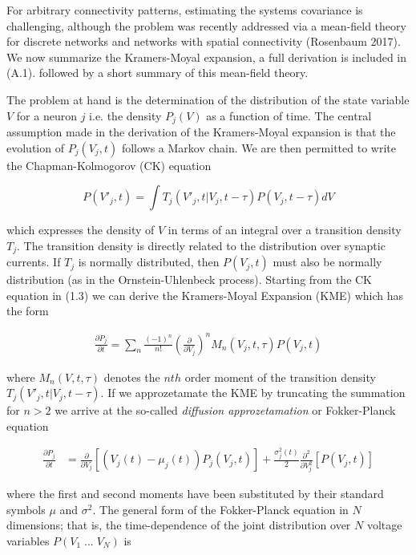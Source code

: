 \documentclass{ucetd}
\begin{document}
For arbitrary connectivity patterns, estimating the systems covariance is challenging, although the problem was recently addressed via a mean-field theory for discrete networks and networks with spatial connectivity (Rosenbaum 2017). We now summarize the Kramers-Moyal expansion, a full derivation is included in (A.1). followed by a short summary of this mean-field theory.

The problem at hand is the determination of the distribution of the state variable $V$ for a neuron $j$ i.e. the density $P_{j}(V)$ as a function of time. The central assumption made in the derivation of the Kramers-Moyal expansion is that the evolution of $P_{j}(V_{j},t)$ follows a Markov chain. We are then permitted to write the Chapman-Kolmogorov (CK) equation

\begin{equation}
P(V'_{j}, t) = \int T_{j}(V'_{j}, t | V_{j}, t-\tau)P(V_{j}, t-\tau)dV
\end{equation} 

which expresses the density of $V$ in terms of an integral over a transition density $T_{j}$. The transition density is directly related to the distribution over synaptic currents. If $T_{j}$ is normally distributed, then $P(V_{j},t)$ must also be normally distribution (as in the Ornstein-Uhlenbeck process). Starting from the CK equation in (1.3) we can derive the Kramers-Moyal Expansion (KME) which has the form

\begin{align}
\frac{\partial P_{j}}{\partial t} = \sum_{n} \frac{(-1)^{n}}{n!} \left(\frac{\partial}{\partial V_{j}}\right)^{n} M_{n}(V_{j},t,\tau) P(V_{j},t)
\end{align}

where $M_{n}(V,t,\tau)$ denotes the $nth$ order moment of the transition density $T_{j}(V'_{j}, t | V_{j}, t-\tau)$. If we approzetamate the KME by truncating the summation for $n > 2$ we arrive at the so-called \emph{diffusion approzetamation} or Fokker-Planck equation

\begin{align}
\frac{\partial P_{j}}{\partial t} &= \frac{\partial}{\partial V_{j}}[\left(V_{j}(t)-\mu_{j}(t)\right) P_{j}(V_{j},t)] + \frac{\sigma_{j}^{2}(t)}{2}\frac{\partial^{2}}{\partial V_{j}^{2}}[P(V_{j},t)]
\end{align}

where the first and second moments have been substituted by their standard symbols $\mu$ and $\sigma^{2}$. The general form of the Fokker-Planck equation in $N$ dimensions; that is, the time-dependence of the joint distribution over $N$ voltage variables $P(V_{1}\;...\;V_{N})$ is
\end{document}
